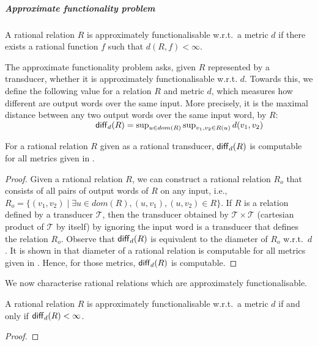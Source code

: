\documentclass[a4paper,UKenglish,cleveref, autoref, thm-restate,authorcolumns, colorlinks]{lipics-v2021}
\newcommand\dom{\mathit{dom}}
\newcommand\calT{\mathcal{T}}
\begin{document}
{\subparagraph*{Approximate functionality problem}

\begin{definition}\label{def:approxfunc}
    A rational relation $R$ is approximately functionalisable w.r.t.~a metric $d$ if there exists a rational function $f$  such that $d(R,f)<\infty$. 
\end{definition}
The approximate functionality problem asks, given $R$ represented by a transducer, whether it is approximately functionalisable w.r.t. $d$. Towards this, we define the following value for a relation $R$ and metric $d$, which measures how different are output words over the same input. More precisely, it is the maximal distance between any two output words over the same input word, by $R$:
\\$
\textcolor{white}{x}~~~~~~~~~~~~~~~~~~~~~~~~~~~~~~{\sf diff}_d(R) = \sup_{u\in dom(R)} \sup_{v_1,v_2\in R(u)} d(v_1,v_2)
$

\begin{lemma}\label{lem:diffcomp}
  For a rational relation $R$ given as a rational transducer, ${\sf diff}_d(R)$ is computable for all metrics given in .
\end{lemma}
\begin{proof}
Given a rational relation $R$, we can construct a rational relation $R_o$ that consists of all pairs of output words of $R$ on any input, i.e., $R_o = \{(v_1,v_2) \mid \exists u \in \dom(R),(u,v_1),(u,v_2)\in R\}$. If $R$ is a relation defined by a transducer $\calT$, then the transducer obtained by $\calT \times \calT$ (cartesian product of $\calT$ by itself) by ignoring the input word is a transducer that defines the relation $R_o$. Observe that ${\sf diff}_d(R)$ is equivalent to the diameter of $R_o$ w.r.t.~$d$. It is shown in \cite{editdistance} that diameter of a rational relation is computable for all metrics given in . Hence, for those metrics, ${\sf diff}_d(R)$ is computable.
\end{proof}

We now characterise rational relations which are approximately functionalisable.

\begin{lemma}\label{lemma:approxfun}
   A rational relation $R$ is approximately functionalisable w.r.t.~a metric $d$ if and only if ${\sf diff}_d(R) < \infty$.
\end{lemma}

\begin{proof}
    

\end{proof}}
\end{document}
